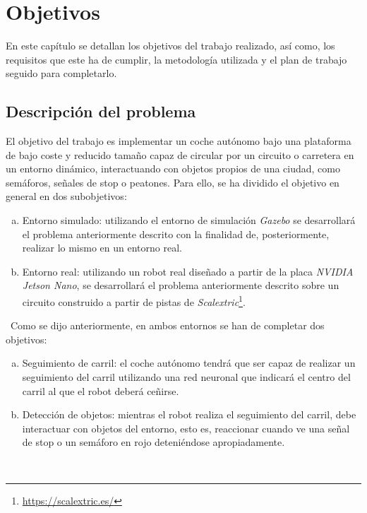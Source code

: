 \chapter{Objetivos}
\label{cap:capitulo2}

En este capítulo se detallan los objetivos del trabajo realizado, así como, los requisitos que este ha de cumplir, la metodología utilizada y el plan de trabajo seguido para completarlo.\\

\section{Descripción del problema}
\label{sec:descripcion}

El objetivo del trabajo es implementar un coche autónomo bajo una plataforma de bajo coste y reducido tamaño capaz de circular por un circuito o carretera en un entorno dinámico, interactuando con objetos propios de una ciudad, como semáforos, señales de stop o peatones. Para ello, se ha dividido el objetivo en general en dos subobjetivos:

\begin{enumerate}[(a)]
	\item Entorno simulado: utilizando el entorno de simulación \textit{Gazebo} se desarrollará el problema anteriormente descrito con la finalidad de, posteriormente, realizar lo mismo en un entorno real.\\
	\item Entorno real: utilizando un robot real diseñado a partir de la placa \textit{NVIDIA Jetson Nano}, se desarrollará el problema anteriormente descrito sobre un circuito construido a partir de pistas de \textit{Scalextric}\footnote{\url{https://scalextric.es/}}.\\
\end{enumerate}\
Como se dijo anteriormente, en ambos entornos se han de completar dos objetivos:

\begin{enumerate}[(a)]
	\item Seguimiento de carril: el coche autónomo tendrá que ser capaz de realizar un seguimiento del carril utilizando una red neuronal que indicará el centro del carril al que el robot deberá ceñirse.
	\item Detección de objetos: mientras el robot realiza el seguimiento del carril, debe interactuar con objetos del entorno, esto es, reaccionar cuando ve una señal de stop o un semáforo en rojo deteniéndose apropiadamente.
\end{enumerate}\

